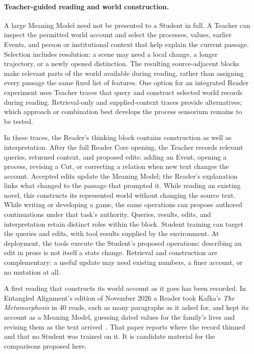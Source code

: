 \documentclass[10pt]{article}
\begin{document}
\paragraph{Teacher-guided reading and world construction.}
\label{par:teacher-world-context}
A large Meaning Model need not be presented to a Student in full. A Teacher
can inspect the permitted world account and select the processes, values,
earlier Events, and person or institutional context that help explain the
current passage. Selection includes resolution: a scene may need a local
change, a longer trajectory, or a newly opened distinction. The resulting
source-adjacent blocks make relevant parts of the world available during
reading, rather than assigning every passage the same fixed list of features.
One option for an integrated Reader experiment uses Teacher traces that query
and construct selected world records during reading. Retrieval-only and
supplied-context traces provide alternatives; which approach or combination
best develops the process sensorium remains to be tested.

In these traces, the Reader's thinking block contains construction as well as
interpretation. After the full Reader Core opening, the Teacher
records relevant queries, returned context, and proposed edits: adding an Event,
opening a process, revising a Cut, or correcting a relation when new text
changes the account. Accepted edits update the Meaning Model; the Reader's
explanation links what changed to the passage that prompted it. While reading
an existing novel, this constructs its represented world without changing the
source text. While writing or developing a game, the same operations can
propose authored continuations under that task's authority. Queries, results,
edits, and interpretation retain distinct roles within the block. Student
training can target the queries and edits, with tool results supplied by the
environment. At deployment, the tools execute the Student's proposed operations;
describing an edit in prose is not itself a state change. Retrieval and
construction are complementary: a useful update may need existing numbers,
a finer account, or no mutation at all.

A first reading that constructs its world account as it goes has been recorded. In
Entangled Alignment's edition of November 2026 a Reader took Kafka's
\emph{The Metamorphosis} in 40 reads, each as many paragraphs as it asked for,
and kept its account as a Meaning Model,
guessing dated values for the family's lives and revising them as the text
arrived~\cite{westerbergEntangled2026}. That paper reports where the record thinned
and that no Student was trained on it. It is candidate material for the comparisons
proposed here.
\end{document}
